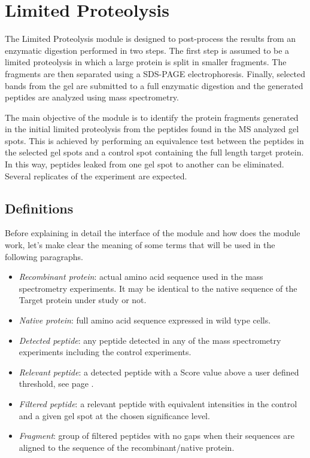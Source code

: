 \chapter{Limited Proteolysis}
\label{chap:limprot}

The Limited Proteolysis module is designed to post-process the results from an enzymatic
digestion performed in two steps. The first step is assumed to be a limited proteolysis
in which a large protein is split in smaller fragments. The fragments are then separated
using a SDS-PAGE electrophoresis. Finally, selected bands from the gel are submitted to
a full enzymatic digestion and the generated peptides are analyzed using mass spectrometry.

The main objective of the module is to identify the protein fragments generated in
the initial limited proteolysis from the peptides found in the MS analyzed gel spots.
This is achieved by performing an equivalence test\cite{Limentani2005} between the
peptides in the selected gel spots and a control spot containing the full length
target protein. In this way, peptides leaked from one gel spot to another can be
eliminated. Several replicates of the experiment are expected.

\section{Definitions}
\label{sec:limprotDefinitions}

Before explaining in detail the interface of the module and how does the module
work, let's make clear the meaning of some terms that will be used in the following
paragraphs.

\begin{itemize}
    \item \textit{Recombinant protein}: actual amino acid sequence used in the mass
    spectrometry experiments. It may be identical to the native sequence of the Target
    protein under study or not.
    \item \textit{Native protein}: full amino acid sequence expressed in wild type cells.
    \item \textit{Detected peptide}: any peptide detected in any of the mass spectrometry
    experiments including the control experiments.
    \item \textit{Relevant peptide}: a detected peptide with a Score value above
    a user defined threshold, see page \pageref{par:limprotScoreValue}.
    \item \textit{Filtered peptide}: a relevant peptide with equivalent intensities
    in the control and a given gel spot at the chosen significance level.\label{par:limprotFP}
    \item \textit{Fragment}: group of filtered peptides with no gaps when their
    sequences are aligned to the sequence of the recombinant/native protein.
\end{itemize}

